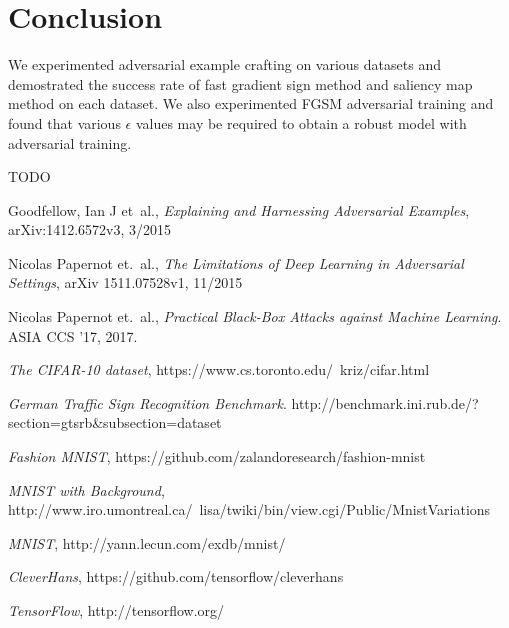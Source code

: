 \documentclass{article}
\begin{document}
\section{Conclusion}

We experimented adversarial example crafting on various datasets and demostrated the success rate of fast gradient sign method and saliency map method on each dataset.
We also experimented FGSM adversarial training and found that various $\epsilon$ values may be required to obtain a robust model with adversarial training.

TODO

\begin{thebibliography}{9}
\raggedright
{}
    Goodfellow, Ian J et\ al.,
    \emph{Explaining and Harnessing Adversarial Examples},	
    arXiv:1412.6572v3,
    3/2015

    Nicolas Papernot et.\ al.,
   \emph{The Limitations of Deep Learning in Adversarial Settings},
    arXiv 1511.07528v1,
    11/2015

    Nicolas Papernot et.\ al.,
    \emph{Practical Black-Box Attacks against Machine Learning}.
    ASIA CCS '17,
    2017.

    \emph{The CIFAR-10 dataset},
    https://www.cs.toronto.edu/~kriz/cifar.html

    \emph{German Traffic Sign Recognition Benchmark}.
    http://benchmark.ini.rub.de/?section=gtsrb\&subsection=dataset

    \emph{Fashion MNIST},
    https://github.com/zalandoresearch/fashion-mnist

    \emph{MNIST with Background},
    http://www.iro.umontreal.ca/~lisa/twiki/bin/view.cgi/Public/MnistVariations

    \emph{MNIST},
    http://yann.lecun.com/exdb/mnist/

    \emph{CleverHans},
    https://github.com/tensorflow/cleverhans

    \emph{TensorFlow},
    http://tensorflow.org/

\end{thebibliography}
\end{document}
